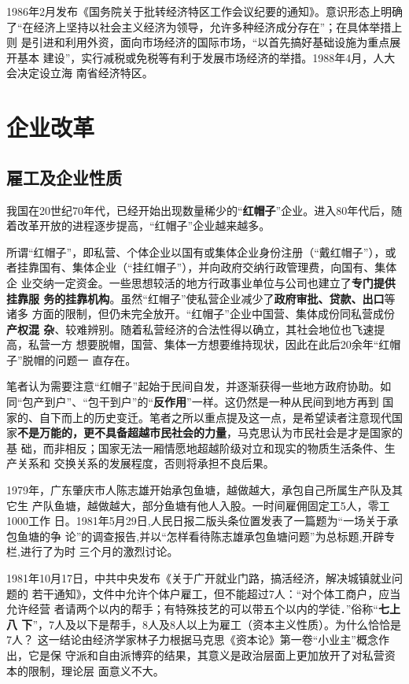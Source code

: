 1986年2月发布《国务院关于批转经济特区工作会议纪要的通知》。意识形态上明确
了“在经济上坚持以社会主义经济为领导，允许多种经济成分存在”；在具体举措上则
是引进和利用外资，面向市场经济的国际市场，“以首先搞好基础设施为重点展开基本
建设”，实行减税或免税等有利于发展市场经济的举措。1988年4月，人大会决定设立海
南省经济特区。


\section{企业改革}

\subsection{雇工及企业性质}

我国在20世纪70年代，已经开始出现数量稀少的“\textbf{红帽子}”企业。进入80年代后，随
着改革开放的进程逐步提高，“红帽子”企业越来越多。

所谓“红帽子”，即私营、个体企业以国有或集体企业身份注册（“戴红帽子”），或
者挂靠国有、集体企业（“挂红帽子”），并向政府交纳行政管理费，向国有、集体企
业交纳一定资金。一些思想较活的地方行政事业单位与公司也建立了\textbf{专门提供挂靠服
  务的挂靠机构}。虽然“红帽子”使私营企业减少了\textbf{政府审批、贷款、出口}等诸多
方面的限制，但仍未完全放开。“红帽子”企业中国营、集体成份同私营成份\textbf{产权混
  杂}、较难辨别。随着私营经济的合法性得以确立，其社会地位也飞速提高，私营一方
想要脱帽，国营、集体一方想要维持现状，因此在此后20余年“红帽子”脱帽的问题一
直存在。

笔者认为需要注意“红帽子”起始于民间自发，并逐渐获得一些地方政府协助。如
同“包产到户”、“包干到户”的“\textbf{反作用}”一样。这仍然是一种从民间到地方再到
国家的、自下而上的历史变迁。笔者之所以重点提及这一点，是希望读者注意现代国
家\textbf{不是万能的，更不具备超越市民社会的力量}，马克思认为市民社会是才是国家的基
础，而非相反；国家无法一厢情愿地超越阶级对立和现实的物质生活条件、生产关系和
交换关系的发展程度，否则将承担不良后果。


1979年，广东肇庆市人陈志雄开始承包鱼塘，越做越大，承包自己所属生产队及其它生
产队鱼塘，越做越大，部分鱼塘有他人入股。一时间雇佣固定工5人，零工1000工作
日。1981年5月29日,人民日报二版头条位置发表了一篇题为“一场关于承包鱼塘的争
论”的调查报告,并以“怎样看待陈志雄承包鱼塘问题”为总标题,开辟专栏,进行了为时
三个月的激烈讨论。

1981年10月17日，中共中央发布《关于广开就业门路，搞活经济，解决城镇就业问题的
若干通知》，文件中允许个体户雇工，但不能超过7人：“对个体工商户，应当允许经营
者请两个以内的帮手；有特殊技艺的可以带五个以内的学徒．”俗称“\textbf{七上八
  下}”，7人及以下是帮手，8人及8人以上为雇工（资本主义性质）。为什么恰恰是7人？
这一结论由经济学家林子力根据马克思《资本论》第一卷“小业主”概念作出，它是保
守派和自由派博弈的结果，其意义是政治层面上更加放开了对私营资本的限制，理论层
面意义不大。

